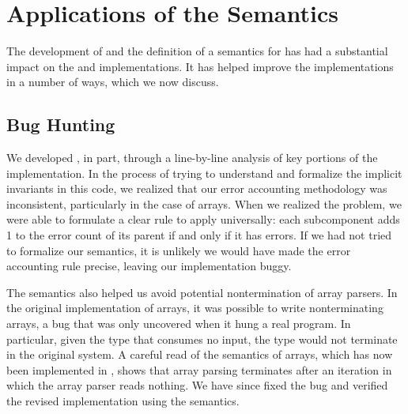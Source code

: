 \section{Applications of the Semantics}
\label{sec:applications}

The development of \ddc{} and the definition of a semantics for \ipads{}
has had a substantial impact on the \padsc{} and \padsml{}
implementations. It has helped improve the implementations in a number
of ways, which we now discuss.

\subsection{Bug Hunting}

We developed \ddc{}, in part, through a line-by-line analysis of key
portions of the \padsc{} implementation.  In the process of trying to understand and formalize the
implicit invariants in this code,
we realized that our error accounting methodology was
inconsistent, particularly in the case of arrays.  When we realized
the problem, we were able to formulate a clear rule to apply
universally: each subcomponent adds 1 to the error count of its parent
if and only if it has errors.  If we had not tried to formalize our
semantics, it is unlikely we would have made the error accounting rule
precise, leaving our implementation buggy.

The semantics also helped us avoid potential nontermination of array
parsers. In the original implementation of \padsc{} arrays, it was
possible to write nonterminating arrays, a bug that was only
uncovered when it hung a real program. In particular, given the
type  that consumes no input, the 
type  would not terminate in the
original system.  A careful read of the 
  \ddc{} semantics of arrays, which has now been implemented in
  \padsc{}, shows that array parsing terminates after an iteration in
  which the array parser reads nothing.
We have since fixed the bug and verified the revised implementation using the semantics.



